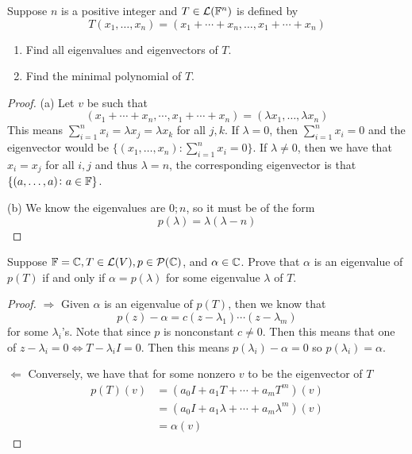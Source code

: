 \documentclass{extarticle}
\begin{document}
\begin{problem}{3}
    Suppose \(n\) is a positive integer and \(T \in \mathcal{L}(\mathbb{F}^n)\) is defined by 
    \[T(x_1, \ldots, x_n) = (x_1 + \cdots + x_n, \ldots, x_1 + \cdots + x_n)\]
    \begin{enumerate}[label=(\alph*)]
        \item Find all eigenvalues and eigenvectors of \(T\). 
        \item Find the minimal polynomial of \(T\).
    \end{enumerate}
\end{problem}


\begin{proof}
(a)  Let \(v\) be such that 
\[(x_1 + \cdots + x_n, \cdots, x_1 + \cdots + x_n) = (\lambda x_1, \ldots, \lambda x_n)\]
This means \(\sum_{i=1}^{n} x_i = \lambda x_j = \lambda x_k\) for all \(j, k\). If \(\lambda = 0\), then 
\(\sum_{i=1}^{n} x_i = 0\) and the eigenvector would be \(\{(x_1, \ldots, x_n) \colon \sum_{i=1}^{n}x_i = 0\}\). 
If \(\lambda \neq 0\), then we have that \(x_i = x_j\) for all \(i, j\) and thus \(\lambda = n\), the corresponding 
eigenvector is that \(\{(a, \ldots, a) \colon a \in \mathbb{F}\}\). 

(b) We know the eigenvalues are \(0; n\), so it must be of the form 
\[p(\lambda) = \lambda (\lambda - n)\]


\end{proof}


\begin{problem}{4}
    Suppose \(\mathbb{F} = \mathbb{C}, T \in \mathcal{L}(V), p \in \mathcal{P}(\mathbb{C})\), and \(\alpha \in \mathbb{C}\). Prove that \(\alpha\) is an 
    eigenvalue of \(p(T)\) if and only if \(\alpha = p(\lambda)\) for some eigenvalue \(\lambda\) of \(T\).
\end{problem}

\begin{proof}
\(\Rightarrow\) Given \(\alpha\) is an eigenvalue of \(p(T)\), then we know that  
\[p(z)  - \alpha = c(z - \lambda_1) \cdots (z - \lambda_m)\]
for some \(\lambda_i\)'s.  Note that since \(p\) is nonconstant \(c \neq 0\). Then this means that 
one of \(z - \lambda_i = 0 \Leftrightarrow T - \lambda_i I = 0\). Then this means \(p(\lambda_i) - \alpha = 0\)
so \(p(\lambda_i) = \alpha\). 

\(\Leftarrow\) Conversely, we have that for some nonzero \(v\) to be the eigenvector of \(T\)
\begin{align*}
    p(T)(v) 
    &= (a_0 I + a_1 T + \cdots + a_m T^m)(v) \\ 
    &= (a_0I + a_1 \lambda + \cdots + a_m \lambda^m)(v) \\ 
    &= \alpha(v)
\end{align*}
\end{proof}
\end{document}
